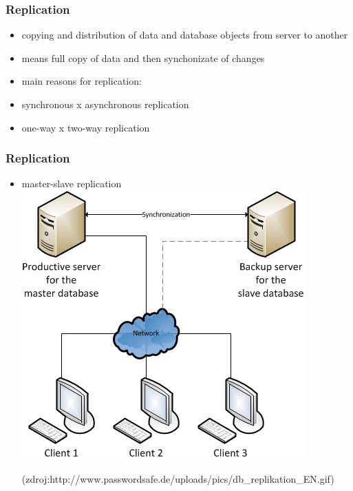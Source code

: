 \documentclass[xcolor=dvipsnames, 14pt]{beamer}
\begin{document}
  \begin{frame}
    \frametitle{Replication}
    \begin{itemize}
      \item copying and distribution of data and database objects from server to another
      \item means full copy of data and then synchonizate of changes
      \item main reasons for replication:
        \begin{itemize}
        \end{itemize}
      \item synchronous x asynchronous replication
      \item one-way x two-way replication
    \end{itemize} 
  \end{frame}

  \begin{frame}
    \frametitle{Replication}
    \begin{itemize}
      \item master-slave replication
      \\  \includegraphics[scale=0.5]{obr/db_replikation.png} 
      \\  \begin{tiny}(zdroj:http://www.passwordsafe.de/uploads/pics/db\_replikation\_EN.gif)\end{tiny}
    \end{itemize} 
  \end{frame}
\end{document}
